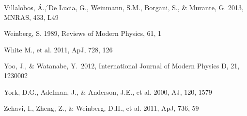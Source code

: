 \documentclass[prl,twocolumn,superscriptaddress,aps,amsmath,amssymb,nofootinbib,altaffilletter]{revtex4}
\begin{document}
\begin{thebibliography}{}
Villalobos, \'{A}., ́De Lucia, G., Weinmann, S.M., Borgani, S., \& Murante, G. 2013, MNRAS, 433, L49


Weinberg, S. 1989, Reviews of Modern Physics, 61, 1

White M., et al. 2011, ApJ, 728, 126

 Yoo, J., \& Watanabe, Y.\ 2012, International Journal of Modern Physics D, 21, 1230002 

York, D.G., Adelman, J., \& Anderson, J.E., et al. 2000, AJ, 120, 1579

Zehavi, I., Zheng, Z., \& Weinberg, D.H., et al. 2011, ApJ, 736, 59

\end{thebibliography}
\end{document}
